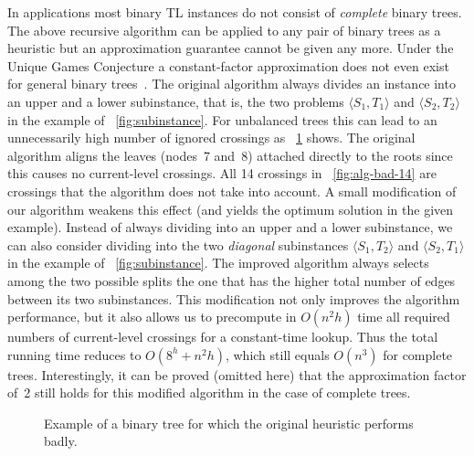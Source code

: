 \documentclass[runningheads,a4paper]{llncs}
\newcommand{\ttree}[1]{\ensuremath{\langle #1 \rangle}}
\begin{document}
In applications most binary TL instances do not consist of \emph{complete} binary
trees. The above recursive algorithm can be applied to any pair of
binary trees as a heuristic but an approximation guarantee cannot be
given any more. Under the Unique Games Conjecture a constant-factor
approximation does not even exist for general binary
trees~\cite{bbbnow-dbtha-08}. The original algorithm always divides an
instance into an upper and a lower subinstance, that is, the two problems
\ttree{S_1,T_1} and \ttree{S_2,T_2} in the example of
\figurename~\ref{fig:subinstance}. For unbalanced trees this can lead
to an unnecessarily high number of ignored crossings as
\figurename~\ref{fig:alg-bad} shows.  The original algorithm aligns
the leaves (nodes~7 and~8) attached directly to the roots since this causes no current-level
crossings. All 14 crossings in \figurename~\ref{fig:alg-bad-14} are
crossings that the algorithm does not take into account. A small
modification of our algorithm weakens this effect (and yields the
optimum solution in the given example). Instead of always dividing
into an upper and a lower subinstance, we can also consider dividing
into the two \emph{diagonal} subinstances \ttree{S_1,T_2} and
\ttree{S_2,T_1} in the example of
\figurename~\ref{fig:subinstance}. The improved algorithm always
selects among the two possible splits the one that has the higher
total number of edges between its two subinstances. This modification
not only improves the algorithm performance, but it also allows us to
precompute in $O(n^2 h)$ time all required numbers of current-level
crossings for a constant-time lookup.
Thus the total running time reduces to $O(8^h + n^2 h)$, which still
equals $O(n^3)$ for complete trees.  Interestingly, it can be proved
(omitted here) that the approximation factor of~2 still holds for this
modified algorithm in the case of complete trees.

\begin{figure}[tb]
  \centering
  \hfil
  \caption{Example of a binary tree for which the original heuristic performs badly.}
  \label{fig:alg-bad}
\end{figure}
\end{document}
